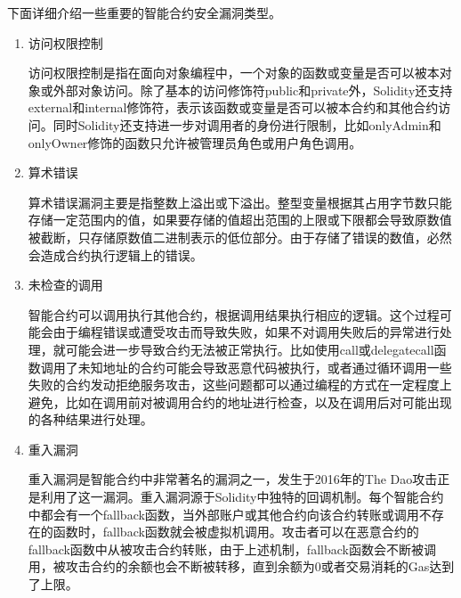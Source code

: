 下面详细介绍一些重要的智能合约安全漏洞类型。
\begin{enumerate}[label=\Alph*., align=left, leftmargin=*]
    \item 访问权限控制
    
    访问权限控制是指在面向对象编程中，一个对象的函数或变量是否可以被本对象或外部对象访问。除了基本的访问修饰符public和private外，Solidity还支持external和internal修饰符，表示该函数或变量是否可以被本合约和其他合约访问。同时Solidity还支持进一步对调用者的身份进行限制，比如onlyAdmin和onlyOwner修饰的函数只允许被管理员角色或用户角色调用\cite{grishchenko2018semantic}。
    \item 算术错误
    
    算术错误漏洞主要是指整数上溢出或下溢出。整型变量根据其占用字节数只能存储一定范围内的值，如果要存储的值超出范围的上限或下限都会导致原数值被截断，只存储原数值二进制表示的低位部分。由于存储了错误的数值，必然会造成合约执行逻辑上的错误。
    \item 未检查的调用
    
    智能合约可以调用执行其他合约，根据调用结果执行相应的逻辑。这个过程可能会由于编程错误或遭受攻击而导致失败，如果不对调用失败后的异常进行处理，就可能会进一步导致合约无法被正常执行。比如使用call或delegatecall函数调用了未知地址的合约可能会导致恶意代码被执行，或者通过循环调用一些失败的合约发动拒绝服务攻击，这些问题都可以通过编程的方式在一定程度上避免，比如在调用前对被调用合约的地址进行检查，以及在调用后对可能出现的各种结果进行处理\cite{zhang2022zh}。
    \item 重入漏洞
    
    重入漏洞是智能合约中非常著名的漏洞之一，发生于2016年的The Dao攻击正是利用了这一漏洞。重入漏洞源于Solidity中独特的回调机制。每个智能合约中都会有一个fallback函数，当外部账户或其他合约向该合约转账或调用不存在的函数时，fallback函数就会被虚拟机调用。攻击者可以在恶意合约的fallback函数中从被攻击合约转账，由于上述机制，fallback函数会不断被调用，被攻击合约的余额也会不断被转移，直到余额为0或者交易消耗的Gas达到了上限。
    
    
    

\end{enumerate}
